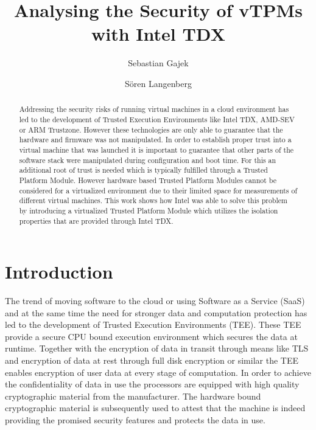 \documentclass[sigplan,screen,nonacm]{acmart}
\begin{document}
\title{Analysing the Security of vTPMs with Intel TDX}


\author{Sebastian Gajek} 


\author{Sören Langenberg} 



\begin{abstract}
Addressing the security risks of running virtual machines in a cloud environment has led to the development of Trusted Execution Environments like Intel TDX, AMD-SEV or ARM Trustzone.
However these technologies are only able to guarantee that the hardware and firmware was not manipulated.
In order to establish proper trust into a virtual machine that was launched it is important to guarantee that other parts of the software stack were manipulated during configuration and boot time.
For this an additional root of trust is needed which is typically fulfilled through a Trusted Platform Module.
However hardware based Trusted Platform Modules cannot be considered for a virtualized environment due to their limited space for measurements of different virtual machines.
This work shows how Intel was able to solve this problem by introducing a virtualized Trusted Platform Module which utilizes the isolation properties that are provided through Intel TDX.
\end{abstract}


\maketitle

\section{Introduction}
The trend of moving software to the cloud or using Software as a Service (SaaS) and at the same time the need for stronger data and computation protection has led to the development of Trusted Execution Environments (TEE).
These TEE provide a secure CPU bound execution environment which secures the data at runtime.
Together with the encryption of data in transit through means like TLS and encryption of data at rest through full disk encryption or similar the TEE enables encryption of user data at every stage of computation.
In order to achieve the confidentiality of data in use the processors are equipped with high quality cryptographic material from the manufacturer.
The hardware bound cryptographic material is subsequently used to attest that the machine is indeed providing the promised security features and protects the data in use.
\end{document}
